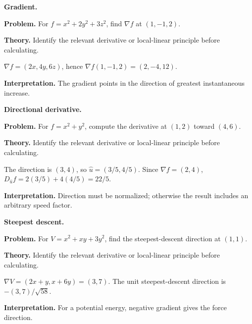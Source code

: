 \begin{workedexample}
\textbf{Gradient.}\par
\textbf{Problem.} For $f=x^2+2y^2+3z^2$, find $\nabla f$ at $(1,-1,2)$.

\textbf{Theory.} Identify the relevant derivative or local-linear principle before calculating.

\begin{solution}
$\nabla f=(2x,4y,6z)$, hence $\nabla f(1,-1,2)=(2,-4,12)$.

\textbf{Interpretation.} The gradient points in the direction of greatest instantaneous increase.
\end{solution}
\end{workedexample}

\begin{workedexample}
\textbf{Directional derivative.}\par
\textbf{Problem.} For $f=x^2+y^2$, compute the derivative at $(1,2)$ toward $(4,6)$.

\textbf{Theory.} Identify the relevant derivative or local-linear principle before calculating.

\begin{solution}
The direction is $(3,4)$, so $\hat u=(3/5,4/5)$. Since $\nabla f=(2,4)$, $D_{\hat u}f=2(3/5)+4(4/5)=22/5$.

\textbf{Interpretation.} Direction must be normalized; otherwise the result includes an arbitrary speed factor.
\end{solution}
\end{workedexample}

\begin{workedexample}
\textbf{Steepest descent.}\par
\textbf{Problem.} For $V=x^2+xy+3y^2$, find the steepest-descent direction at $(1,1)$.

\textbf{Theory.} Identify the relevant derivative or local-linear principle before calculating.

\begin{solution}
$\nabla V=(2x+y,x+6y)=(3,7)$. The unit steepest-descent direction is $-(3,7)/\sqrt{58}$.

\textbf{Interpretation.} For a potential energy, negative gradient gives the force direction.
\end{solution}
\end{workedexample}

